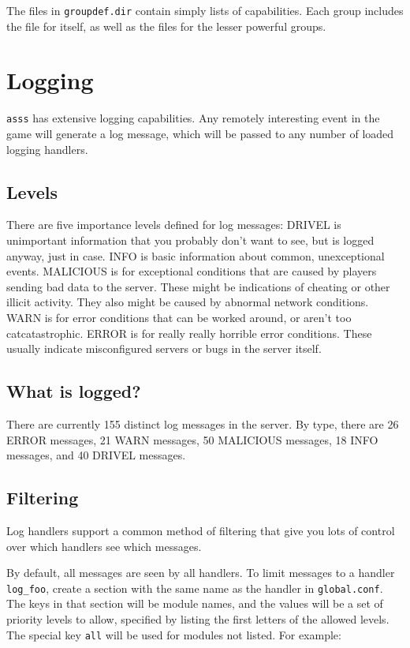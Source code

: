 \documentclass{article}
\newcommand{\asss}{\texttt{asss}}
\begin{document}
The files in \verb/groupdef.dir/ contain simply lists of capabilities.
Each group includes the file for itself, as well as the files for the
lesser powerful groups.


\section{Logging}

\asss{} has extensive logging capabilities. Any remotely interesting
event in the game will generate a log message, which will be passed to
any number of loaded logging handlers.

\subsection{Levels}

There are five importance levels defined for log messages: DRIVEL is
unimportant information that you probably don't want to see, but is
logged anyway, just in case. INFO is basic information about common,
unexceptional events. MALICIOUS is for exceptional conditions that are
caused by players sending bad data to the server. These might be
indications of cheating or other illicit activity. They also might be
caused by abnormal network conditions. WARN is for error conditions that
can be worked around, or aren't too catcatastrophic. ERROR is for really
really horrible error conditions. These usually indicate misconfigured
servers or bugs in the server itself.

\subsection{What is logged?}

There are currently
155
distinct log messages in the server. By type, there are 26 ERROR
messages, 21 WARN messages, 50 MALICIOUS messages, 18 INFO messages, and
40 DRIVEL messages.

\subsection{Filtering}

Log handlers support a common method of filtering that give you lots of
control over which handlers see which messages.

By default, all messages are seen by all handlers. To limit messages to
a handler \verb/log_foo/, create a section with the same name as the
handler in \verb/global.conf/. The keys in that section will be module
names, and the values will be a set of priority levels to allow,
specified by listing the first letters of the allowed levels. The
special key \verb/all/ will be used for modules not listed. For example:
\end{document}
